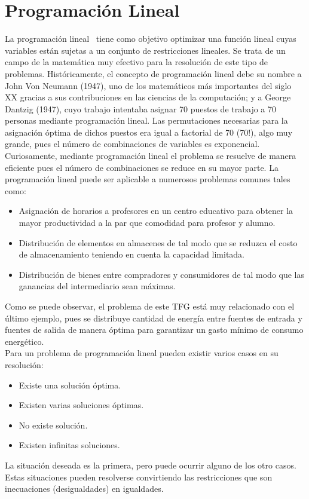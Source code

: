 \section{Programación Lineal}
La programación lineal~\cite{Loom64} tiene como objetivo optimizar una función lineal cuyas variables están sujetas a un conjunto de restricciones lineales.
Se trata de un campo de la matemática muy efectivo para la resolución de este tipo de problemas. Históricamente, el concepto de programación lineal debe su nombre a John Von Neumann (1947), uno de los matemáticos más importantes del siglo XX gracias a sus contribuciones en las ciencias de la computación; y a George Dantzig (1947), cuyo trabajo intentaba asignar 70 puestos de trabajo a 70 personas mediante programación lineal. Las permutaciones necesarias para la asignación óptima de dichos puestos era igual a factorial de 70 (70!), algo muy grande, pues el número de combinaciones de variables es exponencial. Curiosamente, mediante programación lineal el problema se resuelve de manera eficiente pues el número de combinaciones se reduce en su mayor parte. La programación lineal puede ser aplicable a numerosos problemas comunes tales como:
\begin{itemize}
\item Asignación de horarios a profesores en un centro educativo para obtener la mayor productividad a la par que comodidad para profesor y alumno.
\item Distribución de elementos en almacenes de tal modo que se reduzca el costo de almacenamiento teniendo en cuenta la capacidad limitada.
\item Distribución de bienes entre compradores y consumidores de tal modo que las ganancias del intermediario sean máximas.
\end{itemize}
Como se puede observar, el problema de este \gls{TFG} está muy relacionado con el último ejemplo, pues se distribuye cantidad de energía entre fuentes de entrada y fuentes de salida de manera óptima para garantizar un gasto mínimo de consumo energético.\\

Para un problema de programación lineal pueden existir varios casos en su resolución:
\begin{itemize}
\item Existe una solución óptima.
\item Existen varias soluciones óptimas.
\item No existe solución.
\item Existen infinitas soluciones.
\end{itemize}
La situación deseada es la primera, pero puede ocurrir alguno de los otro casos. Estas situaciones pueden resolverse convirtiendo las restricciones que son inecuaciones (desigualdades) en igualdades.\\

